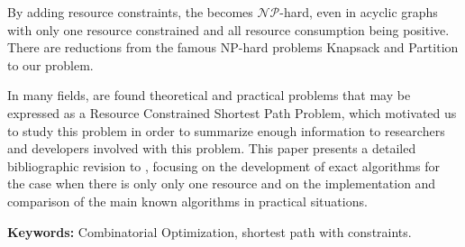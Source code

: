 By adding resource constraints, the \spp becomes $\mathcal{NP}$-hard, 
even in acyclic graphs
with only one resource constrained and all resource consumption being positive.
There are reductions from the famous NP-hard problems Knapsack and Partition to
our problem.

In many fields, are found theoretical and practical problems that may be
expressed as a Resource Constrained Shortest Path Problem, which
motivated us to
study this problem in order to summarize enough information to researchers and
developers involved with this problem. This paper presents a detailed
bibliographic revision to \rcsp, focusing on the development of exact 
algorithms
for the case when there is only only one resource and on the implementation and
comparison of the main known algorithms in practical situations.


\noindent \textbf{Keywords:} Combinatorial Optimization, shortest path 
with constraints.


